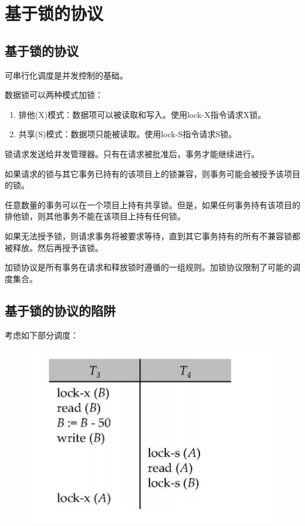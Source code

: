 \section{基于锁的协议}

\subsection{基于锁的协议}

可串行化调度是并发控制的基础。

数据锁可以两种模式加锁：
\begin{enumerate}
    \item 排他(X)模式：数据项可以被读取和写入。使用lock-X指令请求X锁。
    \item 共享(S)模式：数据项只能被读取。使用lock-S指令请求S锁。
\end{enumerate}

锁请求发送给并发管理器。只有在请求被批准后，事务才能继续进行。

如果请求的锁与其它事务已持有的该项目上的锁兼容，则事务可能会被授予该项目的锁。

任意数量的事务可以在一个项目上持有共享锁。但是，如果任何事务持有该项目的排他锁，则其他事务不能在该项目上持有任何锁。

如果无法授予锁，则请求事务将被要求等待，直到其它事务持有的所有不兼容锁都被释放。然后再授予该锁。

加锁协议是所有事务在请求和释放锁时遵循的一组规则。加锁协议限制了可能的调度集合。

\subsection{基于锁的协议的陷阱}

考虑如下部分调度：

\begin{figure}[H]
    \centering
    \includegraphics[width=0.7\linewidth]{image1.png}
    \caption{}
    \label{}
\end{figure}

